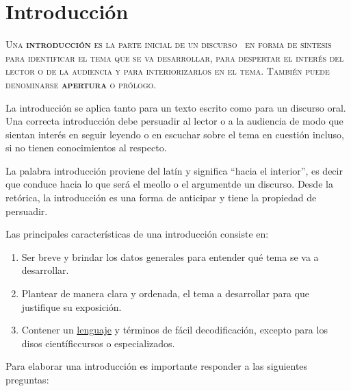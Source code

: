 \documentclass[12pt]{book}
\begin{document}
 
\chapter*{Introducción}

\begin{multicols}{3}
{\scshape \normalsize
Una  \hspace*{0.5cm} {\bf introducción}
es la parte inicial  de un discurso \ en forma de síntesis para identificar 
el  tema que se va desarrollar, para despertar el interés del lector o de la audiencia y para
interiorizarlos en el tema. También puede denominarse {\bf apertura} o {\color{blue} prólogo.}\vspace{0.5cm}


La introducción se aplica tanto para un texto escrito como 
para un discurso oral. Una correcta introducción debe persuadir al lector o a la audiencia de modo 
que sientan interés en seguir leyendo o en escuchar sobre el tema en cuestión 
incluso, si no tienen conocimientos al respecto. \vspace{1cm}


La palabra introducción 
proviene del latín y significa “hacia el interior”, es decir que conduce 
hacia lo que será el meollo o el argumentde un discurso. 
Desde la retórica, la introducción es 
una forma de anticipar y tiene la propiedad de persuadir. \vspace{0.5cm}

Las principales características de una introducción consiste en: }

\end{multicols} 
\begin{enumerate}
    \item[\HandCuffRight] Ser breve y brindar los datos generales para entender qué tema se va a desarrollar.
    \item[\HandCuffRight] Plantear de manera clara y ordenada, el tema a desarrollar para que
    justifique su exposición.
    \item[\HandCuffRight] Contener un {\color{blue} \underline{lenguaje} }y términos de fácil decodificación, excepto para
    los disos científiccursos o especializados.
\end{enumerate}
Para elaborar una introducción es importante responder a las siguientes
preguntas:
\newpage
\end{document}
